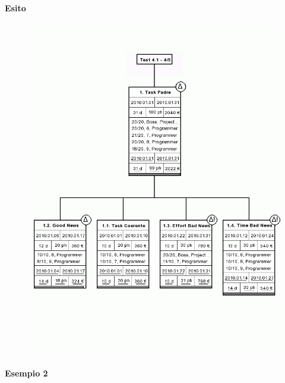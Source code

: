 \paragraph{Esito}
\begin{figure}[h!]
\centering
\includegraphics[width=\textwidth]{tests/TEST_WBS/4.1/4.1_4_5/Esempio_1/output.png}
\end{figure}
\newpage

\paragraph{Esempio 2}
